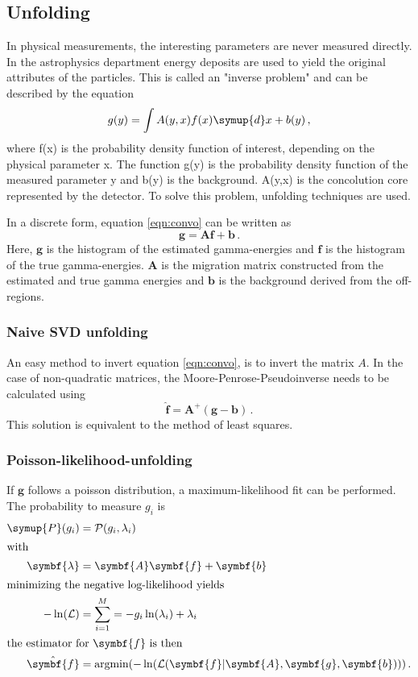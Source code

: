 \subsection{Unfolding}
In physical measurements, the interesting parameters are never measured directly. 
In the astrophysics department energy deposits are used to yield the original attributes of the particles. This is called an "inverse problem" and can be described by 
the equation
\begin{equation}
  g(y) = \int A(y,x) f(x) \symup{d}x + b(y) \, ,
  \label{eqn:convo}
\end{equation}
where f(x) is the probability density function of interest, depending on the physical parameter x. 
The function g(y) is the probability density function of the measured parameter y and b(y) is the background. A(y,x) is the concolution core represented by the detector.
To solve this problem, unfolding techniques are used. \par 
In a discrete form, equation \eqref{eqn:convo} can be written as
\begin{equation}
  \symbf{g} = \symbf{A}\symbf{f} + \symbf{b} \, .
\end{equation}
Here, $\symbf{g}$ is the histogram of the estimated gamma-energies and $\symbf{f}$ is the histogram of the true gamma-energies.
$\symbf{A}$ is the migration matrix constructed from the estimated and true gamma energies and $\symbf{b}$ is the background derived from the off-regions.

\subsubsection{Naive SVD unfolding}
An easy method to invert equation \eqref{eqn:convo}, is to invert the 
matrix $A$. In the case of non-quadratic matrices, the 
Moore-Penrose-Pseudoinverse needs to be calculated using
\begin{equation}
  \hat{\symbf{f}} = \symbf{A}^{+}(\symbf{g} - \symbf{b}) \, .
  \label{eqn:svd}
\end{equation}
This solution is equivalent to the method of least squares.

\subsubsection{Poisson-likelihood-unfolding}
If $\symbf{g}$ follows a poisson distribution, a maximum-likelihood fit can be performed.
The probability to measure $g_i$ is
\begin{align}
  \symup{P}(g_i) &= \mathcal{P}(g_i, \lambda_i) \\
  \shortintertext{with}
  \symbf{\lambda} &= \symbf{A}\symbf{f} + \symbf{b} \\
  \intertext{minimizing the negative log-likelihood yields}
  -\ln(\mathcal{L}) &= \sum_{i=1}^{M} = -g_i \ln(\lambda_i) + \lambda_i \\
  \intertext{the estimator for $\symbf{f}$ is then}
  \hat{\symbf{f}} &= \text{argmin}(-\ln(\mathcal{L}(\symbf{f}|\symbf{A},\symbf{g},\symbf{b})))\, .
\end{align} 
